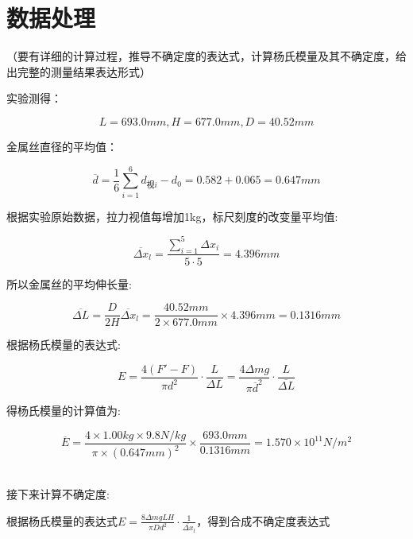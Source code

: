 \documentclass{ctexart}
\begin{document}

\newpage

\section{数据处理}

（要有详细的计算过程，推导不确定度的表达式，计算杨氏模量及其不确定度，给出完整的测量结果表达形式）

实验测得：

$$ L = 693.0mm, H = 677.0mm, D = 40.52mm$$

金属丝直径的平均值：

$$ \overline{d} = \frac{1}{6}\sum_{i = 1}^{6}d_{\text{视}i} - d_0 = 0.582 + 0.065 = 0.647 mm $$

根据实验原始数据，拉力视值每增加1kg，标尺刻度的改变量平均值:

$$ \overline{\Delta x}_{l} = \frac{\sum_{i=1}^{5}\Delta x_i}{5 \cdot 5} = 4.396 mm $$

所以金属丝的平均伸长量:

$$ \overline{\Delta L} = \frac{D}{2H} \overline{\Delta x}_{l} = \frac{40.52 mm}{2 \times 677.0 mm}\times 4.396 mm = 0.1316 mm $$

根据杨氏模量的表达式:

$$ E = \frac{4\left(F'-F\right)}{\pi d^2} \cdot \frac{L}{\Delta L} = \frac{4\Delta m g}{\pi \overline{d}^2} \cdot \frac{L}{\overline{\Delta L}}$$

得杨氏模量的计算值为:

$$ \overline{E} = \frac{4\times 1.00 kg \times 9.8 N/kg}{\pi \times (0.647 mm)^2} \times \frac{693.0 mm}{0.1316 mm} = 1.570 \times 10^{11} N/m^2 $$

~\\
接下来计算不确定度:

根据杨氏模量的表达式$E = \frac{8\Delta mgLH}{\pi Dd^2}\cdot\frac{1}{\overline{\Delta x}_{l}}$，得到合成不确定度表达式
\end{document}
